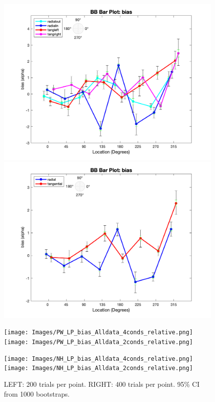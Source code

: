 \documentclass[11pt]{article} %
\begin{document}
\begin{figure}[H]
\centering %
\includegraphics[scale=.3]{Images/BB_LP_bias_Alldata_4conds.png}
\includegraphics[scale=.3]{Images/BB_LP_bias_Alldata_2conds.png}
\end{figure}
\begin{figure}[H]
\centering %
\texttt{[image: Images/PW\_LP\_bias\_Alldata\_4conds\_relative.png]}
\texttt{[image: Images/PW\_LP\_bias\_Alldata\_2conds\_relative.png]}
\end{figure}
\begin{figure}[H]
\centering %
\texttt{[image: Images/NH\_LP\_bias\_Alldata\_4conds\_relative.png]}
\texttt{[image: Images/NH\_LP\_bias\_Alldata\_2conds\_relative.png]}
\caption{LEFT: 200 trials per point. RIGHT: 400 trials per point. 95\% CI from 1000 bootstraps.}
\end{figure}
\end{document}
